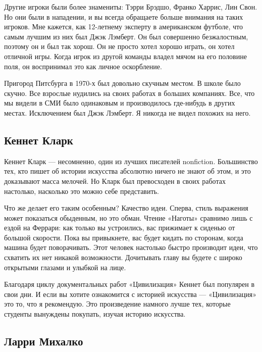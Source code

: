 \documentclass[ebook,12pt,oneside,openany]{memoir}
\begin{document}
Другие игроки были более знамениты: Тэрри Брэдшо, Франко Харрис, Лин
Свон. Но они были в нападении, и вы всегда обращаете больше внимания
на таких игроков. Мне кажется, как 12-летнему эксперту в американском
футболе, что самым лучшим из них был Джэк Лэмберт. Он был совершенно
безжалостным, поэтому он и был так хорош. Он не просто хотел хорошо
играть, он хотел отличной игры. Когда игрок из другой команды владел
мячом на его половине поля, он воспринимал это как личное оскорбление. \newline

Пригород Питсбурга в 1970-х был довольно скучным местом. В школе было
скучно. Все взрослые нудились на своих работах в больших компаниях.
Все, что мы видели в СМИ было одинаковым и производилось где-нибудь в
других местах. Исключением был Джэк Лэмберт. Я никогда не видел
похожих на него. \newline

\subsection{Кеннет Кларк}

Кеннет Кларк — несомненно, один из лучших писателей nonfiction.
Большинство тех, кто пишет об истории искусства абсолютно ничего не
знают об этом, и это доказывают масса мелочей. Но Кларк был
превосходен в своих работах настолько, насколько это можно себе
представить. \newline

Что же делает его таким особенным? Качество идеи. Сперва, стиль
выражения может показаться обыденным, но это обман. Чтение «Наготы»
сравнимо лишь с ездой на Феррари: как только вы устроились, вас
прижимает к сиденью от большой скорости. Пока вы привыкнете, вас будет
кидать по сторонам, когда машина будет поворачивать. Этот человек
настолько быстро производит идеи, что схватить их нет никакой
возможности. Дочитывать главу вы будете с широко открытыми глазами и
улыбкой на лице. \newline

Благодаря циклу документальных работ «Цивилизация» Кеннет был
популярен в свои дни. И если вы хотите ознакомится с историей
искусства — «Цивилизация» это то, что я рекомендую. Это произведение
намного лучше тех, которые студенты вынуждены покупать, изучая историю
искусства. \newline

\subsection{Ларри Михалко}
\end{document}
